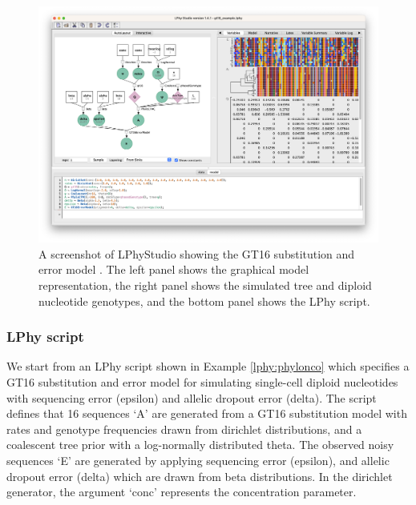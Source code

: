 \documentclass[10pt,letterpaper,table]{article}
\theoremstyle{definition}
\begin{document}
\begin{figure}[!ht]
    \centering
    \includegraphics[width=\textwidth]{figs_plos/phylonco.png }
    \caption{A screenshot of LPhyStudio showing the GT16 substitution and error model \cite{kozlov2022cellphy, chen2022accounting}. 
    The left panel shows the graphical model representation, the right panel shows the simulated tree and diploid nucleotide genotypes, and the bottom panel shows the LPhy script. }
\end{figure}

\subsubsection*{LPhy script}
We start from an LPhy script shown in Example \ref{lphy:phylonco} which specifies a GT16 substitution and error model \cite{kozlov2022cellphy} for simulating single-cell diploid nucleotides with sequencing error (epsilon) and allelic dropout error (delta).
The script defines that 16 sequences `A' are generated from a GT16 substitution model with rates and genotype frequencies drawn from dirichlet distributions, and a coalescent tree prior with a log-normally distributed theta.
The observed noisy sequences `E' are generated by applying sequencing error (epsilon), and allelic dropout error (delta) which are drawn from beta distributions. 
In the dirichlet generator, the argument `conc' represents the concentration parameter. 
\end{document}
